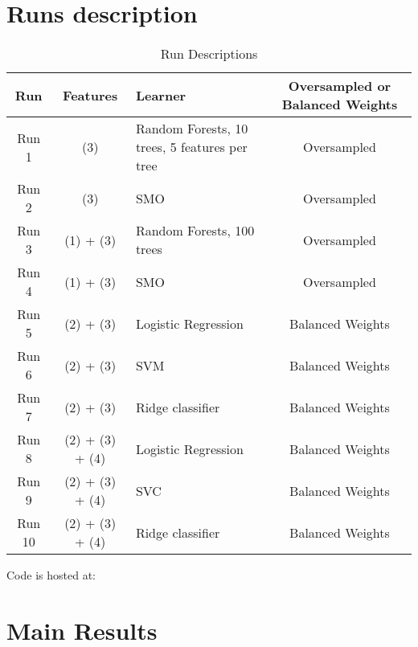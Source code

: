 \documentclass{article}
\begin{document}
\section{Runs description}
\begin{table}[h!]
\begin{center}

\begin{tabular}{|c|c|l|c|}
\hline
\textbf Run & \textbf {Features} & \textbf {Learner} & \textbf{Oversampled or Balanced Weights} \\
\hline
\hline Run 1 &  (3) & Random Forests, 10 trees, 5 features per tree & Oversampled \\
\hline Run 2 & (3) & SMO & Oversampled \\
\hline Run 3 & (1) + (3) & Random Forests, 100 trees & Oversampled \\
\hline Run 4 & (1) + (3) &SMO & Oversampled \\
\hline Run 5 & (2) + (3) & Logistic Regression & Balanced Weights \\
\hline Run 6 & (2) + (3) & SVM & Balanced Weights\\
\hline Run 7 & (2) + (3) & Ridge classifier & Balanced Weights\\
\hline Run 8 & (2) + (3) + (4) & Logistic Regression & Balanced Weights \\
\hline Run 9 & (2) + (3) + (4)  & SVC & Balanced Weights\\
\hline Run 10 & (2) + (3) + (4) & Ridge classifier & Balanced Weights \\
\hline
\end{tabular}
\caption{Run Descriptions}
\end{center}

Code is hosted at: 

\end{table}


\section{Main Results}
\end{document}
